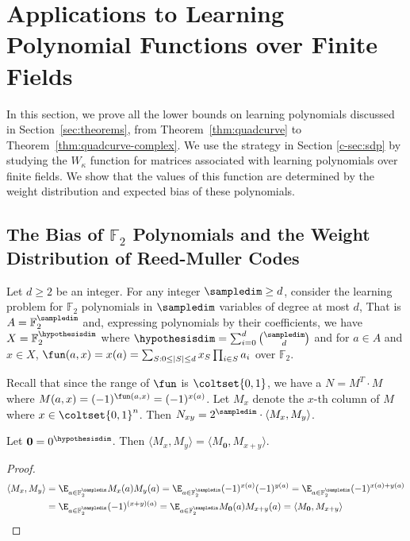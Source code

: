 \newcommand{\w}{\textrm{weight}}
\newpage\section{Applications to Learning Polynomial Functions over Finite Fields}

In this section, we prove all the lower bounds on learning polynomials discussed in Section~\ref{sec:theorems}, from Theorem~\ref{thm:quadcurve} to Theorem~\ref{thm:quadcurve-complex}. We use the strategy in Section \ref{c-sec:sdp} by studying the $W_\kappa$ function for matrices associated with learning polynomials over finite fields.   We show that the values of this function are determined by the weight distribution and expected bias
of these polynomials.

\subsection{The Bias of $\mathbb{F}_2$ Polynomials and the Weight Distribution of Reed-Muller Codes}
\label{sec:f2-reed-muller}

Let $d\ge 2$ be an integer.  For any integer $\sampledim\ge d$, consider the learning
problem for $\mathbb{F}_2$ polynomials in $\sampledim$ variables of degree at most $d$, 
That is $A=\mathbb{F}_2^\sampledim$ and, expressing polynomials by their coefficients,
we have $X=\mathbb{F}_2^\hypothesisdim$ where $\hypothesisdim=\sum_{i=0}^d \binom{\sampledim}{d}$ and
for $a\in A$ and $x\in X$,
$\fun (a,x)=x(a)=\sum_{S: 0\leq |S|\leq d} x_S \prod_{i\in S} a_i$ over
$\mathbb{F}_2$.

Recall that since the range of $\fun$ is $\coltset{0,1}$,
we have a $N=M^T\cdot M$ 
where $M(a,x)=(-1)^{\fun(a,x)}=(-1)^{x(a)}$.
Let $M_x$ denote the $x$-th column of $M$ where $x\in \coltset{0,1}^n$.
Then $N_{xy}=2^\sampledim \cdot \langle M_x,M_y\rangle$.

\begin{proposition}
\label{prop:equalrows}
Let $\mathbf{0}=0^\hypothesisdim$.
Then $\langle M_x,M_y\rangle=\langle M_{\mathbf{0}},M_{x+y}\rangle$.
\end{proposition}

\begin{proof}
\begin{align*}
\langle M_x,M_y\rangle&=\E_{a\in \mathbb{F}_2^\sampledim} M_x(a)M_y(a)
=\E_{a\in \mathbb{F}_2^\sampledim} (-1)^{x(a)}(-1)^{y(a)}
=\E_{a\in \mathbb{F}_2^\sampledim} (-1)^{x(a)+y(a)}\\
&=\E_{a\in \mathbb{F}_2^\sampledim} (-1)^{(x+y)(a)}
=\E_{a\in \mathbb{F}_2^\sampledim} M_{\mathbf{0}}(a)M_{x+y}(a)
=\langle M_{\mathbf{0}},M_{x+y}\rangle
\end{align*}
\end{proof}

